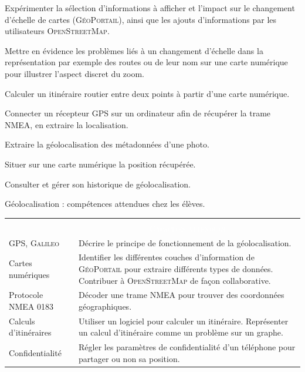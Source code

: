 \begin{tcolorbox}[title={Ce que propose le programme}, toprule=0pt, leftrule=0pt, rightrule=0pt, arc=0pt,
                  fonttitle=\scshape\boxtitlefont,
                  colbacktitle=white, coltitle=firstcolor, colframe=firstcolor, colback=firstcolor!10,
                  breakable, enhanced jigsaw]
\begin{jazzitemize}
\item Expérimenter la sélection d’informations à afficher et l’impact sur le changement d’échelle de cartes (\textsc{GéoPortail}), ainsi que les ajouts d’informations par les utilisateurs \textsc{OpenStreetMap}.   
\item Mettre en évidence les problèmes liés à un changement d’échelle dans la représentation par exemple des routes ou de leur nom sur une carte numérique pour illustrer l’aspect discret du zoom. 
\item Calculer un itinéraire routier entre deux points à partir d’une carte numérique. 
\item Connecter un récepteur GPS sur un ordinateur afin de récupérer la trame NMEA, en extraire la localisation.
\item Extraire la géolocalisation des métadonnées d’une photo.
\item Situer sur une carte numérique la position récupérée.
\item Consulter et gérer son historique de géolocalisation. 
\end{jazzitemize}
\end{tcolorbox}

\begin{jazztable*}
\caption{\label{tab:VIII.1}Géolocalisation : compétences attendues chez les élèves.}
\Centering
\begingroup
\small
\renewcommand*{\arraystretch}{1.6}
\begin{tabularx}{\linewidth}{lX}
\rowcolor{secondcolor}
\multicolumn{2}{c}{\Gape[6pt]{\textcolor{white}{\textbf{Géolocalisation}}}} \\
\rowcolor{firstcolor}
\multicolumn{1}{c}{\scshape\titlingfont\textcolor{white}{Contenus}} 
	&	\multicolumn{1}{c}{\scshape\titlingfont\textcolor{white}{Capacités attendues}} \\
GPS, \textsc{Galileo}
  & Décrire le principe de fonctionnement de la géolocalisation. \\
Cartes  numériques 
  & Identifier les différentes couches d’information de \textsc{GéoPortail} pour extraire différents types de données.
    Contribuer à \textsc{OpenStreetMap} de façon collaborative.\\
Protocole NMEA 0183 &
  Décoder une trame NMEA pour trouver des coordonnées géographiques. \\
Calculs d’itinéraires &
  Utiliser un logiciel pour calculer un itinéraire.
  Représenter un calcul d’itinéraire comme un problème sur un graphe. \\
Confidentialité &
  Régler les paramètres de confidentialité d’un téléphone pour partager ou non sa position.
\end{tabularx}%
\endgroup
\end{jazztable*}



